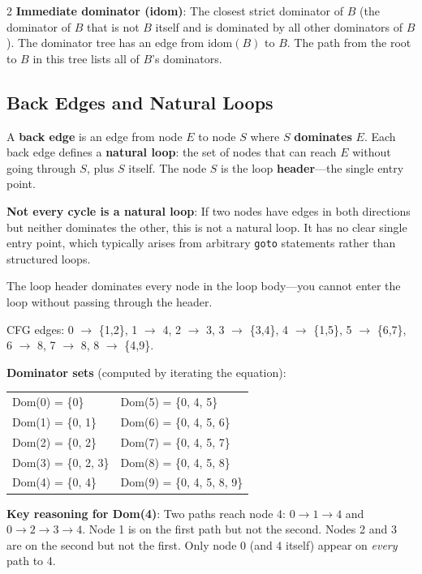 \documentclass[9pt,landscape]{extarticle}
\begin{document}
\begin{multicols}{2}
\textbf{Immediate dominator (idom)}: The closest strict dominator of $B$ (the dominator of $B$ that is not $B$ itself and is dominated by all other dominators of $B$). The dominator tree has an edge from $\text{idom}(B)$ to $B$. The path from the root to $B$ in this tree lists all of $B$'s dominators.

\subsection{Back Edges and Natural Loops}

A \textbf{back edge} is an edge from node $E$ to node $S$ where $S$ \textbf{dominates} $E$. Each back edge defines a \textbf{natural loop}: the set of nodes that can reach $E$ without going through $S$, plus $S$ itself. The node $S$ is the loop \textbf{header}---the single entry point.

\textbf{Not every cycle is a natural loop}: If two nodes have edges in both directions but neither dominates the other, this is not a natural loop. It has no clear single entry point, which typically arises from arbitrary \texttt{goto} statements rather than structured loops.

The loop header dominates every node in the loop body---you cannot enter the loop without passing through the header.

\begin{exambox}
CFG edges: 0 $\to$ \{1,2\}, 1 $\to$ 4, 2 $\to$ 3, 3 $\to$ \{3,4\}, 4 $\to$ \{1,5\}, 5 $\to$ \{6,7\}, 6 $\to$ 8, 7 $\to$ 8, 8 $\to$ \{4,9\}.

\textbf{Dominator sets} (computed by iterating the equation):

\begin{tabular}{@{}ll@{}}
Dom(0) = \{0\} & Dom(5) = \{0, 4, 5\} \\
Dom(1) = \{0, 1\} & Dom(6) = \{0, 4, 5, 6\} \\
Dom(2) = \{0, 2\} & Dom(7) = \{0, 4, 5, 7\} \\
Dom(3) = \{0, 2, 3\} & Dom(8) = \{0, 4, 5, 8\} \\
Dom(4) = \{0, 4\} & Dom(9) = \{0, 4, 5, 8, 9\} \\
\end{tabular}

\textbf{Key reasoning for Dom(4)}: Two paths reach node 4: $0 \to 1 \to 4$ and $0 \to 2 \to 3 \to 4$. Node 1 is on the first path but not the second. Nodes 2 and 3 are on the second but not the first. Only node 0 (and 4 itself) appear on \emph{every} path to 4.


\end{exambox}
\end{multicols}
\end{document}
